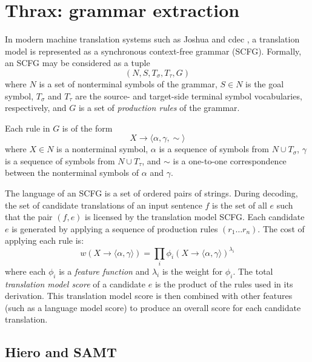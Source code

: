 \documentclass[11pt]{article}
\begin{document}
\section{Thrax: grammar extraction}

In modern machine translation systems such as Joshua \cite{Joshua-WMT} and cdec \cite{cdec}, a translation model is represented as a synchronous context-free grammar (SCFG). Formally, an SCFG may be considered as a tuple
$$(N,S,T_\sigma,T_\tau,G)$$
where $N$ is a set of nonterminal symbols of the grammar, $S \in N$ is the goal symbol, $T_\sigma$ and $T_\tau$ are the source- and target-side terminal symbol vocabularies, respectively, and $G$ is a set of {\em production rules} of the grammar.

Each rule in $G$ is of the form
$$X \to \langle \alpha , \gamma , \sim \rangle$$
where $X \in N$ is a nonterminal symbol, $\alpha$ is a sequence of symbols from $N \cup T_\sigma$, $\gamma$ is a sequence of symbols from $N \cup T_\tau$, and $\sim$ is a one-to-one correspondence between the nonterminal symbols of $\alpha$ and $\gamma$.

The language of an SCFG is a set of ordered pairs of strings. During
decoding, the set of candidate translations of an input sentence $f$
is the set of all $e$ such that the pair $(f,e)$ is licensed by the
translation model SCFG.  Each candidate $e$ is generated by applying a
sequence of production rules $(r_1 \ldots r_n)$.  The cost of applying each rule is:
%
\begin{equation}
w(X \to \langle \alpha, \gamma \rangle) = \prod_i{\phi_i(X \to \langle \alpha , \gamma \rangle)^{\lambda_i}}
\end{equation}
%
where each $\phi_i$ is a {\em feature function} and $\lambda_i$ is the
weight for $\phi_i$.  The total {\em translation model score} of a
candidate $e$ is the product of the rules used in its derivation.
This translation model score is then combined with other features
(such as a language model score) to produce an overall score for each
candidate translation.

\subsection{Hiero and SAMT}
\end{document}
